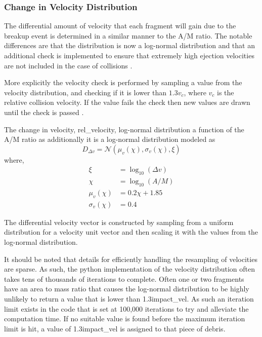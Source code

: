 \documentclass[a4paper, 12pt]{article}
\begin{document}
\subsubsection{Change in Velocity Distribution }
The differential amount of velocity that each fragment will gain due to the breakup event is determined in a similar manner to the A/M ratio. The notable differences are that the distribution is now a log-normal distribution and that an additional check is implemented to ensure that extremely high ejection velocities are not included in the case of collisions \citep{letizia_space_2016}. 

More explicitly the velocity check is performed by sampling a value from the velocity distribution, and checking if it is lower than $1.3v_c$, where $v_c$ is the relative collision velocity. If the value fails the check then new values are drawn until the check is passed \citep{letizia_space_2016}.

The change in velocity, \Gls{rel_velocity},  log-normal distribution a function of the A/M ratio as additionally it is a log-normal distribution modeled as
\begin{equation}
	D_{\Delta v}= \mathcal{N}(\mu_{v}(\chi), \sigma_{v}(\chi), \xi)
\end{equation}
\noindent where, \begin{align}
	\xi &= \log_{10}(\Delta v)\\
	\chi &= \log_{10}(A/M)\\
	\mu_{v}(\chi) &= 0.2\chi+1.85\\
	 \sigma_{v}(\chi) &= 0.4
\end{align}

The differential velocity vector is constructed by sampling from a uniform distribution for a velocity unit vector and then scaling it with the values from the log-normal distribution. 

It should be noted that details for efficiently handling the resampling of velocities are sparse. As such, the python implementation of the velocity distribution often takes tens of thousands of iterations to complete. Often one or two fragments have an area to mass ratio that causes the log-normal distribution to be highly unlikely to return a value that is lower than 1.3\Gls{impact_vel}. As such an iteration limit exists in the code that is set at 100,000 iterations to try and alleviate the computation time. If no suitable value is found before the maximum iteration limit is hit, a value of 1.3\Gls{impact_vel} is assigned to that piece of debris.
\end{document}
